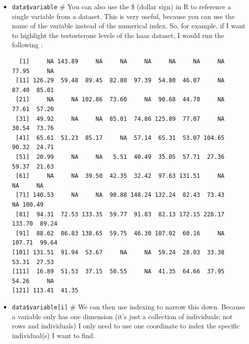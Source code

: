 \documentclass[
  letterpaper,
  DIV=11,
  numbers=noendperiod,
  oneside]{scrreprt}
\newenvironment{Shaded}{\begin{snugshade}}{\end{snugshade}}
\newcommand{\DecValTok}[1]{\textcolor[rgb]{0.68,0.00,0.00}{#1}}
\newcommand{\NormalTok}[1]{\textcolor[rgb]{0.00,0.23,0.31}{#1}}
\newcommand{\SpecialCharTok}[1]{\textcolor[rgb]{0.37,0.37,0.37}{#1}}
\begin{document}
\begin{itemize}
\item
  \texttt{data\$variable} \# You can also use the \$ (dollar sign) in R
  to reference a single variable from a dataset. This is very useful,
  because you can use the name of the variable instead of the numerical
  index. So, for example, if I want to highlight the testosterone levels
  of the haas dataset, I would run the following :

\begin{Shaded}
\end{Shaded}

\begin{verbatim}
  [1]     NA 143.89     NA     NA     NA     NA     NA     NA  77.95     NA
 [11] 126.29  59.48  89.45  82.80  97.39  54.80  46.07     NA  87.40  85.01
 [21]     NA     NA 102.86  73.60     NA  90.68  44.70     NA  77.61  57.20
 [31]  49.92     NA     NA  85.01  74.86 125.89  77.07     NA  30.54  73.76
 [41]  65.61  51.23  85.17     NA  57.14  65.31  53.07 104.65  90.32  24.71
 [51]  20.99     NA     NA   5.51  40.49  35.05  57.71  27.36  59.37  21.63
 [61]     NA     NA  39.50  42.35  32.42  97.63 131.51     NA     NA     NA
 [71] 140.53     NA     NA  90.88 148.24 132.24  82.43  73.43     NA 100.49
 [81]  94.31  72.53 133.35  59.77  91.83  82.13 172.15 228.17 133.70  89.24
 [91]  88.62  86.83 138.65  59.75  46.30 107.02  60.16     NA 107.71  99.64
[101] 131.51  91.94  53.67     NA     NA  59.24  28.03  33.38  53.31  27.53
[111]  16.89  51.53  37.15  50.55     NA  41.35  64.66  37.95  54.26     NA
[121] 113.41  41.35
\end{verbatim}
\item
  \texttt{data\$variable{[}i{]}} \# We can then use indexing to narrow
  this down. Because a variable only has one dimension (it's just a
  collection of individuals; not rows and individuals) I only need to
  use one coordinate to index the specific individual(s) I want to find.
\end{itemize}

\begin{Shaded}
\end{Shaded}
\end{document}
